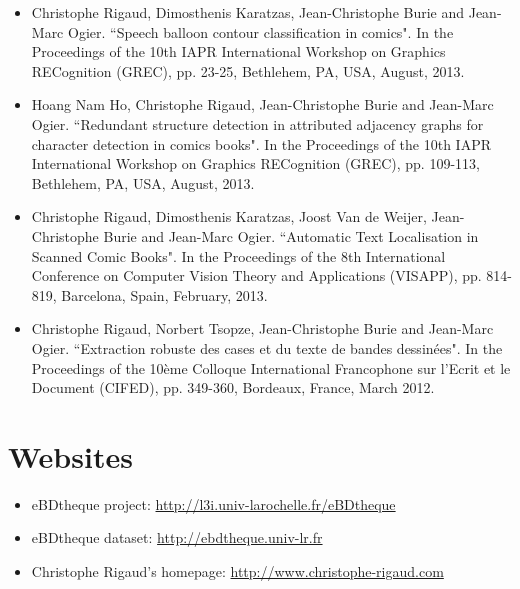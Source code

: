\begin{itemize}
\item Christophe Rigaud, Dimosthenis Karatzas, Jean-Christophe Burie and Jean-Marc Ogier. ``Speech balloon contour classification in comics". In the Proceedings of the 10th IAPR International Workshop on Graphics RECognition (GREC), pp. 23-25, Bethlehem, PA, USA, August, 2013.
\vspace*{.3cm}

\item Hoang Nam Ho, Christophe Rigaud, Jean-Christophe Burie and Jean-Marc Ogier. ``Redundant structure detection in attributed adjacency graphs for character detection in comics books". In the Proceedings of the 10th IAPR International Workshop on Graphics RECognition (GREC), pp. 109-113, Bethlehem, PA, USA, August, 2013.
\vspace*{.3cm}

\item Christophe Rigaud, Dimosthenis Karatzas, Joost Van de Weijer, Jean-Christophe Burie and Jean-Marc Ogier. ``Automatic Text Localisation in Scanned Comic Books". In the Proceedings of the 8th International Conference on Computer Vision Theory and Applications (VISAPP), pp. 814-819, Barcelona, Spain, February, 2013.
\vspace*{.3cm}


\item Christophe Rigaud, Norbert Tsopze, Jean-Christophe Burie and Jean-Marc Ogier. ``Extraction robuste des cases et du texte de bandes dessin{\'e}es". In the Proceedings of the 10{\`e}me Colloque International Francophone sur l'Ecrit et le Document (CIFED), pp. 349-360, Bordeaux, France, March 2012.
\vspace*{.3cm}



\end{itemize}

\section*{Websites}

\begin{itemize}
	\item eBDtheque project: \url{http://l3i.univ-larochelle.fr/eBDtheque}
	\item eBDtheque dataset: \url{http://ebdtheque.univ-lr.fr}
	\item Christophe Rigaud's homepage: \url{http://www.christophe-rigaud.com}
\end{itemize}
